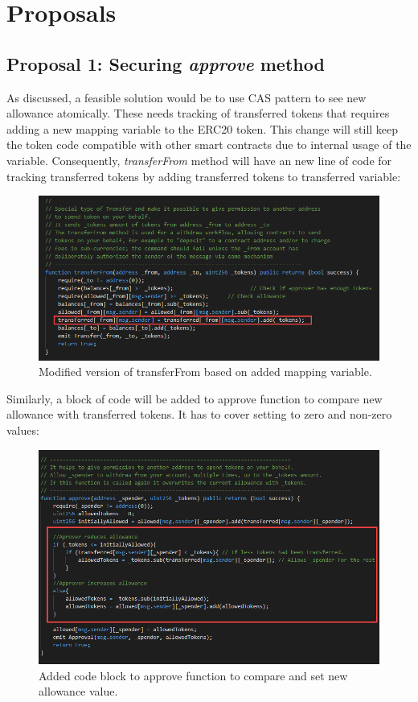 
\section{Proposals}
\subsection{Proposal 1: Securing \textit{approve} method}
As discussed, a feasible solution would be to use CAS pattern to see new allowance atomically. These needs tracking of transferred tokens that requires adding a new mapping variable to the ERC20 token. This change will still keep the token code compatible with other smart contracts due to internal usage of the variable. Consequently, \textit{transferFrom} method will have an new line of code for tracking transferred tokens by adding transferred tokens to transferred variable:
\begin{figure}[H]
	\centering
	\includegraphics[width=1.0\linewidth]{figures/multiple_withdrawal_14.png}
	\caption{Modified version of transferFrom based on added mapping variable.}
\end{figure}
Similarly, a block of code will be added to approve function to compare new allowance with transferred tokens. It has to cover setting to zero and non-zero values:
\begin{figure}[H]
	\centering
	\includegraphics[width=1.0\linewidth]{figures/multiple_withdrawal_15.png}
	\caption{Added code block to approve function to compare and set new allowance value.}
\end{figure}
